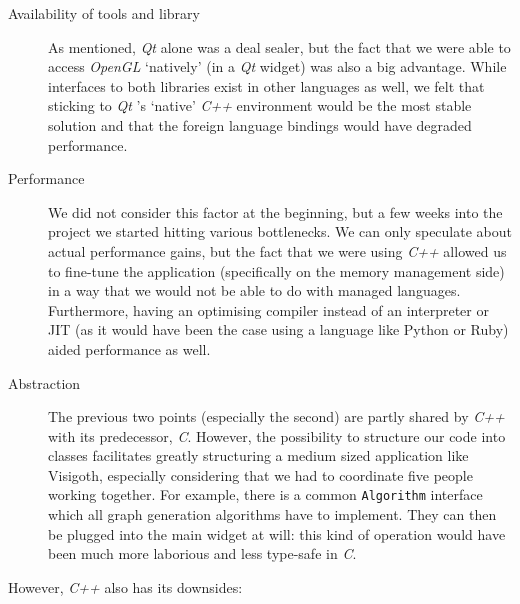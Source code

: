 \documentclass[a4paper,11pt,titlepage]{article}
\newcommand{\code}[1]{\texttt{#1}}
\newcommand{\buzz}[1]{\emph{#1}}
\newcommand{\Qt}{\buzz{Qt} }
\newcommand{\OpenGL}{\buzz{OpenGL} }
\begin{document}
\begin{description}

\item [Availability of tools and library] As mentioned, \Qt alone was
  a deal sealer, but the fact that we were able to access \OpenGL
  `natively' (in a \Qt widget) was also a big advantage. While
  interfaces to both libraries exist in other languages as well, we
  felt that sticking to \Qt's `native' \buzz{C++} environment would be
  the most stable solution and that the foreign language bindings
  would have degraded performance.

\item [Performance] We did not consider this factor at the beginning,
  but a few weeks into the project we started hitting various
  bottlenecks. We can only speculate about actual performance gains,
  but the fact that we were using \buzz{C++} allowed us to fine-tune
  the application (specifically on the memory management side) in a
  way that we would not be able to do with managed
  languages. Furthermore, having an optimising compiler instead of an
  interpreter or JIT (as it would have been the case using a language
  like Python or Ruby) aided performance as well.

\item [Abstraction] The previous two points (especially the second)
  are partly shared by \buzz{C++} with its predecessor,
  \buzz{C}. However, the possibility to structure our code into
  classes facilitates greatly structuring a medium sized application
  like Visigoth, especially considering that we had to coordinate five
  people working together.  For example, there is a common
  \code{Algorithm} interface which all graph generation algorithms
  have to implement. They can then be plugged into the main widget at
  will: this kind of operation would have been much more laborious and
  less type-safe in \buzz{C}.

\end{description}

However, \buzz{C++} also has its downsides:
\end{document}
